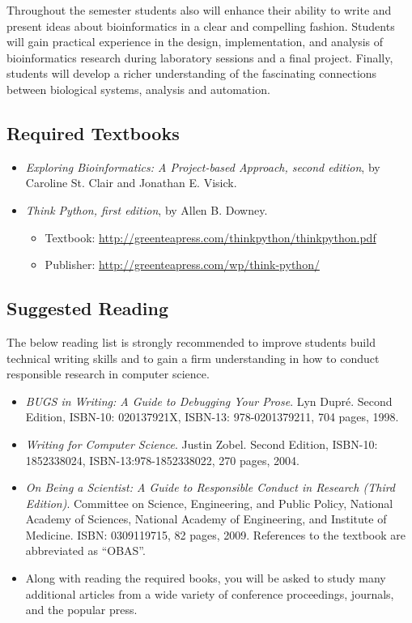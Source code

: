 \documentclass[11pt]{article} %
\begin{document}
\noindent Throughout the semester students also will enhance their ability to write and present ideas about bioinformatics in a clear and compelling fashion. Students will gain practical experience in the design, implementation, and analysis of bioinformatics research during laboratory sessions and a final project. Finally, students will develop a richer understanding of the fascinating connections between biological systems, analysis and automation.


\subsection*{\textbf{Required Textbooks}}
\begin{itemize}

\item \emph{Exploring Bioinformatics: A Project-based Approach, second edition}, by Caroline St. Clair and
Jonathan E. Visick.

\item \emph{Think Python, first edition}, by Allen B. Downey.
	\begin{itemize}
		\item Textbook: \url{http://greenteapress.com/thinkpython/thinkpython.pdf}
		\item Publisher: \url{http://greenteapress.com/wp/think-python/}
	\end{itemize}
\end{itemize}



\subsection*{\textbf{Suggested Reading}}

The below reading list is strongly recommended to improve students build technical writing skills and to gain a firm understanding in how to conduct responsible research in computer science.


\begin{itemize}

\item {\em BUGS in Writing: A Guide to Debugging Your Prose}. Lyn Dupr\'e. Second Edition,  ISBN-10: 020137921X, ISBN-13: 978-0201379211, 704 pages, 1998.

\item {\em Writing for Computer Science}.  Justin Zobel. Second Edition,  ISBN-10: 1852338024, ISBN-13:978-1852338022, 270 pages, 2004.

\item  \emph{On Being a Scientist: A Guide to Responsible Conduct in Research (Third Edition)}. Committee on Science, Engineering, and Public Policy, National Academy of Sciences, National Academy of Engineering, and Institute of Medicine. ISBN: 0309119715, 82 pages, 2009. References to the textbook are abbreviated as ``OBAS''.

\item Along with reading the required books, you will be asked to study many additional articles from a wide variety of conference proceedings, journals, and the popular press.
\end{itemize}
\end{document}

